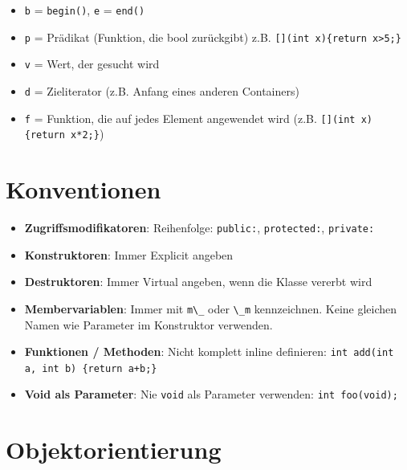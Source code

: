 \documentclass[8pt, landscape]{article}
\newcommand{\datastruct}[1]{\textbf{\textcolor{red!60!black}{#1}}}
\begin{document}
\begin{multicols*}{4}
\begin{tabularx}{\linewidth}{l >{\RaggedRight}X}
 \bottomrule
 \end{tabularx}

 \begin{itemize}
     \item \lstinline|b| = \lstinline|begin()|, \lstinline|e| = \lstinline|end()|
     \item \lstinline|p| = Prädikat (Funktion, die bool zurückgibt) z.B. \lstinline|[](int x){return x>5;}|
     \item \lstinline|v| = Wert, der gesucht wird
     \item \lstinline|d| = Zieliterator (z.B. Anfang eines anderen Containers)
     \item \lstinline|f| = Funktion, die auf jedes Element angewendet wird (z.B. \lstinline|[](int x){return x*2;}|)
 \end{itemize}

\section{Konventionen}

\begin{itemize}
\item \datastruct{Zugriffsmodifikatoren}: Reihenfolge: \lstinline|public:|, \lstinline|protected:|, \lstinline|private:|
\item \datastruct{Konstruktoren}: Immer Explicit angeben 
\item \datastruct{Destruktoren}: Immer Virtual angeben, wenn die Klasse vererbt wird
\item \datastruct{Membervariablen}: Immer mit \lstinline|m\_| oder \lstinline|\_m| kennzeichnen. Keine gleichen Namen wie Parameter im Konstruktor verwenden.
\item \datastruct{Funktionen / Methoden}: Nicht komplett inline definieren: \lstinline|int add(int a, int b) {return a+b;}|
\item \datastruct{Void als Parameter}: Nie \lstinline|void| als Parameter verwenden: \lstinline|int foo(void);|
\end{itemize}

\section{Objektorientierung}


\end{multicols*}
\end{document}
